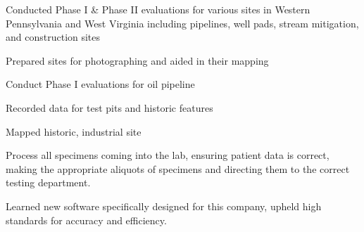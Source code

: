 \documentclass[letterpaper]{resume}
\begin{document}
\begin{compactitem}
\item Conducted Phase I \& Phase II evaluations for various sites in Western Pennsylvania and West Virginia including pipelines, well pads, stream mitigation, and construction sites
\item Prepared sites for photographing and aided in their mapping
\end{compactitem}

\begin{compactitem}
\item Conduct Phase I evaluations for oil pipeline
\item Recorded data for test pits and historic features
\item Mapped historic, industrial site
\end{compactitem}

\begin{compactitem}
\item Process all specimens coming into the lab, ensuring patient data is correct, making the appropriate aliquots of specimens and directing them to the correct testing department.
\item Learned new software specifically designed for this company, upheld high standards for accuracy and efficiency.
\end{compactitem}


\end{document}
